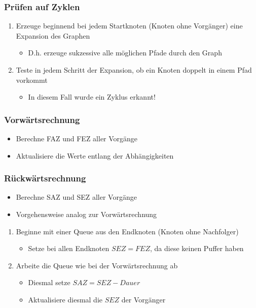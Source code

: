 \documentclass[ngerman, t]{beamer}
\begin{document}
\begin{frame}
  \frametitle{Pr\"ufen auf Zyklen}
  \begin{enumerate}
    \item Erzeuge beginnend bei jedem Startknoten (Knoten ohne
      Vorg\"anger) eine Expansion des Graphen
      \begin{itemize}
        \item D.h. erzeuge sukzessive alle m\"oglichen Pfade durch den Graph
      \end{itemize}
    \item Teste in jedem Schritt der Expansion, ob ein Knoten doppelt
      in einem Pfad vorkommt
      \begin{itemize}
        \item In diesem Fall wurde ein Zyklus erkannt!
      \end{itemize}
  \end{enumerate}
\end{frame}

\begin{frame}
  \frametitle{Vorw\"artsrechnung}
  \begin{itemize}
    \item Berechne FAZ und FEZ aller Vorg\"ange
    \item Aktualisiere die Werte entlang der Abh\"angigkeiten
  \end{itemize}
  \begin{figure}
    \resizebox{\textwidth}{!}{}
  \end{figure}
\end{frame}

\begin{frame}
  \frametitle{R\"uckw\"artsrechnung}
  \begin{itemize}
    \item Berechne SAZ und SEZ aller Vorg\"ange
    \item Vorgehensweise analog zur Vorw\"artsrechnung
  \end{itemize}
  \begin{enumerate}
    \item Beginne mit einer Queue aus den Endknoten (Knoten ohne
      Nachfolger)
      \begin{itemize}
        \item Setze bei allen Endknoten $SEZ=FEZ$, da diese keinen
          Puffer haben
      \end{itemize}
    \item Arbeite die Queue wie bei der Vorw\"artsrechnung ab
      \begin{itemize}
        \item Diesmal setze $SAZ=SEZ-Dauer$
        \item Aktualisiere diesmal die $SEZ$ der Vorg\"anger
      \end{itemize}
  \end{enumerate}
\end{frame}
\end{document}
